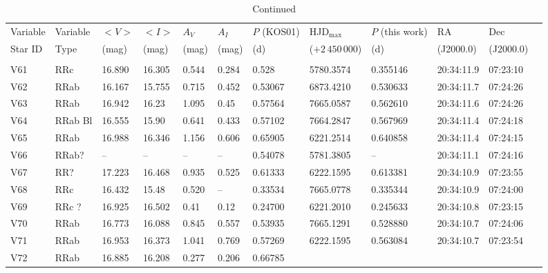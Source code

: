 \documentclass[journal]{rmaa}
\newcommand{\1}{\'{\i}}
\begin{document}
\begin{table*}
\scriptsize
\begin{center}

\caption{Continued}
\label{variables}

\begin{tabular}{llllllllllll}
\hline
Variable & Variable & $<V>$ & $<I>$   & $A_V$  & $A_I$   & $P$ (KOS01) &
HJD$_{\mathrm{max}}$
& $P$ (this work)    & RA   & Dec         \\
Star ID  & Type     & (mag) & (mag)   & (mag)  & (mag)   & (d)  &
($+2\,450\,000$) & (d) & (J2000.0)   & (J2000.0)    \\
&&&&&&&&&& & \\
\hline
V61       & RRc     & 16.890  &16.305  & 0.544  & 0.284  & 0.528
       & 5780.3574     &0.355146   &20:34:11.9  & 07:23:10\\
V62      & RRab    & 16.167 & 15.755 & 0.715 & 0.452 & 0.53067
       & 6873.4210    &  0.530633   & 20:34:11.7 &  07:24:26\\
V63      & RRab   &16.942  & 16.23 & 1.095 & 0.45 & 0.57564
        & 7665.0587     &0.562610   & 20:34:11.6  & 07:24:26\\
V64      & RRab  Bl    & 16.555 & 15.90 &0.641   & 0.433 & 0.57102
       & 7664.2847     &0.567969 & 20:34:11.4  & 07:24:18\\
V65      & RRab     & 16.988   &16.346 & 1.156  & 0.606  & 0.65905
       & 6221.2514    &0.640858   &20:34:11.4 &  07:24:15\\
V66      & RRab?    & --  & -- & -- & --   & 0.54078
       & 5781.3805    & --  & 20:34:11.1  & 07:24:16\\
V67       & RR?     & 17.223   &16.468  & 0.935  & 0.525  & 0.61333
       & 6222.1595     &0.613381   &20:34:10.9 &  07:23:55\\
V68      & RRc    & 16.432  &15.48 & 0.520 & --   & 0.33534
       & 7665.0778    & 0.335344   & 20:34:10.9 &  07:24:00\\
V69       & RRc ?   &16.925  &16.502 & 0.41 & 0.12 & 0.24700
        & 6221.2010    &0.245633 & 20:34:10.8  & 07:23:15\\
V70       & RRab    & 16.773 & 16.088 &0.845   & 0.557 & 0.53935
       & 7665.1291     &0.528880 & 20:34:10.7 &  07:24:06\\
V71       & RRab     & 16.953   &16.373  & 1.041  & 0.769  & 0.57269
       & 6222.1595   &0.563084   &20:34:10.7  & 07:23:54\\
V72      & RRab    & 16.885  & 16.208 & 0.277 &0.206  & 0.66785

\end{tabular}
\end{center}
\end{table*}
\end{document}
